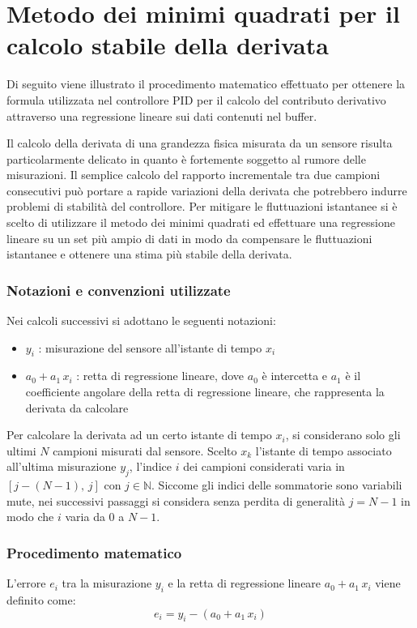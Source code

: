 \appendix
\chapter{Metodo dei minimi quadrati per il calcolo stabile della derivata}
\label{chap:derivata_regressione_lineare}
Di seguito viene illustrato il procedimento matematico effettuato per ottenere la formula utilizzata nel controllore PID per
il calcolo del contributo derivativo attraverso una regressione lineare sui dati contenuti nel buffer.

Il calcolo della derivata di una grandezza fisica misurata da un sensore risulta particolarmente delicato in quanto è fortemente
soggetto al rumore delle misurazioni. Il semplice calcolo del rapporto incrementale tra due campioni consecutivi può portare
a rapide variazioni della derivata che potrebbero indurre problemi di stabilità del controllore. Per mitigare le fluttuazioni
istantanee si è scelto di utilizzare il metodo dei minimi quadrati ed effettuare una regressione lineare su un set più ampio
di dati in modo da compensare le fluttuazioni istantanee e ottenere una stima più stabile della derivata.

\subsection*{Notazioni e convenzioni utilizzate}
Nei calcoli successivi si adottano le seguenti notazioni:
\begin{itemize}
	\item \(y_i\) : misurazione del sensore all'istante di tempo \(x_i\)
	\item \(a_0 + a_1 \, x_i\) : retta di regressione lineare, dove \(a_0\) è intercetta e \(a_1\) è il coefficiente angolare
	della retta di regressione lineare, che rappresenta la derivata da calcolare
\end{itemize}

Per calcolare la derivata ad un certo istante di tempo \(x_i\), si considerano solo gli ultimi \(N\) campioni misurati dal
sensore. Scelto \(x_k\) l'istante di tempo associato all'ultima misurazione \(y_j\), l'indice \(i\) dei campioni considerati
varia in \([j \!-\! (N \!-\! 1), \, j]\) con \(j \in \mathbb{N}\). Siccome gli indici delle sommatorie sono variabili mute,
nei successivi passaggi si considera senza perdita di generalità \(j = N \!-\! 1\) in modo che \(i\) varia da \(0\) a \(N-1\).

\subsection*{Procedimento matematico}
L'errore \(e_i\) tra la misurazione \(y_i\) e la retta di regressione lineare \(a_0 + a_1 \, x_i\) viene definito come:
\begin{equation}
	e_i = y_i - (a_0 + a_1 \, x_i)
\end{equation}

